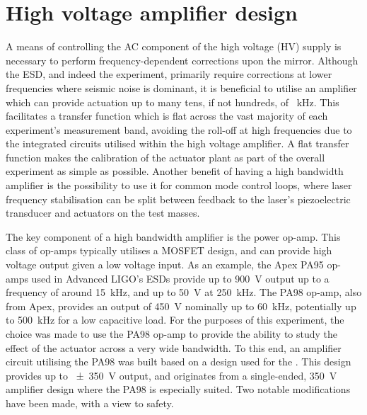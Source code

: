 \section{\label{sec:hv-amplifier}High voltage amplifier design}

A means of controlling the \gls{AC} component of the high voltage (\gls{HV}) supply is necessary to perform frequency-dependent corrections upon the mirror. Although the \gls{ESD}, and indeed the \SSM{} experiment, primarily require corrections at lower frequencies where seismic noise is dominant, it is beneficial to utilise an amplifier which can provide actuation up to many tens, if not hundreds, of \SI{}{\kilo\hertz}. This facilitates a transfer function which is flat across the vast majority of each experiment's measurement band, avoiding the roll-off at high frequencies due to the integrated circuits utilised within the high voltage amplifier. A flat transfer function makes the calibration of the actuator plant as part of the overall experiment as simple as possible. Another benefit of having a high bandwidth amplifier is the possibility to use it for common mode control loops, where laser frequency stabilisation can be split between feedback to the laser's piezoelectric transducer and actuators on the test masses.

The key component of a high bandwidth amplifier is the power op-amp. This class of op-amps typically utilises a \gls{MOSFET} design, and can provide high voltage output given a low voltage input. As an example, the Apex PA95 op-amps used in Advanced LIGO's \glspl{ESD} provide up to \SI{900}{\volt} output up to a frequency of around \SI{15}{\kilo\hertz}, and up to \SI{50}{\volt} at \SI{250}{\kilo\hertz}. The PA98 op-amp, also from Apex, provides an output of \SI{450}{\volt} nominally up to \SI{60}{\kilo\hertz}, potentially up to \SI{500}{\kilo\hertz} for a low capacitive load. For the purposes of this experiment, the choice was made to use the PA98 op-amp to provide the ability to study the effect of the actuator across a very wide bandwidth. To this end, an amplifier circuit utilising the PA98 was built based on a design used for the \AEIPROTOTYPE{}. This design provides up to \SI{\pm350}{\volt} output, and originates from a single-ended, \SI{350}{\volt} amplifier design where the PA98 is especially suited. Two notable modifications have been made, with a view to safety.


